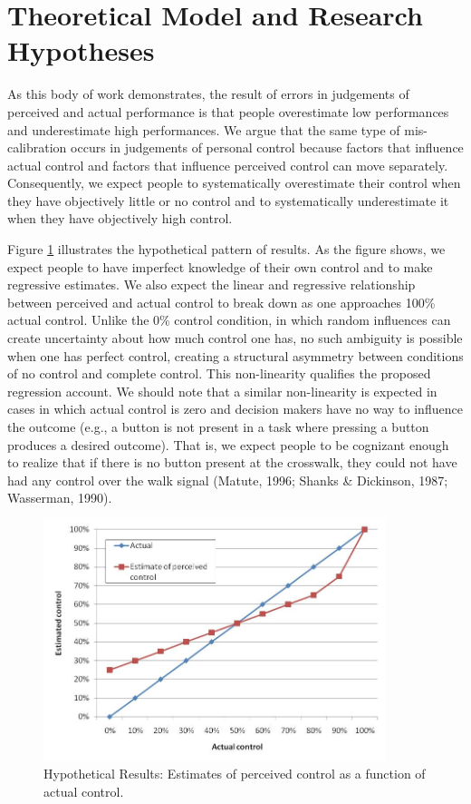 \documentclass[USenglish,letterpaper,12pt,extrafontsizes,oneside,onecolumn,final]{memoir}
\begin{document}
\section{Theoretical Model and Research Hypotheses}
As this body of work demonstrates, the result of errors in judgements of perceived and actual performance is that people overestimate low performances and underestimate high performances. We argue that the same type of mis-calibration occurs in judgements of personal control because factors that influence actual control and factors that influence perceived control can move separately. Consequently, we expect people to systematically overestimate their control when they have objectively little or no control and to systematically underestimate it when they have objectively high control.

Figure \ref{fig:ioc-fig-1} illustrates the hypothetical pattern of results. As the figure shows, we expect people to have imperfect knowledge of their own control and to make regressive estimates. We also expect the linear and regressive relationship between perceived and actual control to break down as one approaches 100\% actual control. Unlike the 0\% control condition, in which random influences can create uncertainty about how much control one has, no such ambiguity is possible when one has perfect control, creating a structural asymmetry between conditions of no control and complete control. This non-linearity qualifies the proposed regression account. We should note that a similar non-linearity is expected in cases in which actual control is zero and decision makers have no way to influence the outcome (e.g., a button is not present in a task where pressing a button produces a desired outcome). That is, we expect people to be cognizant enough to realize that if there is no button present at the crosswalk, they could not have had any control over the walk signal (Matute, 1996; Shanks \& Dickinson, 1987; Wasserman, 1990).  

\begin{figure}[t]
\begin{center}
\includegraphics[width=10cm]{ioc-fig-1}
\caption{\textsf{Hypothetical Results: Estimates of perceived control as a function of actual control.}\label{fig:ioc-fig-1}}
\end{center}
\end{figure}
\end{document}
